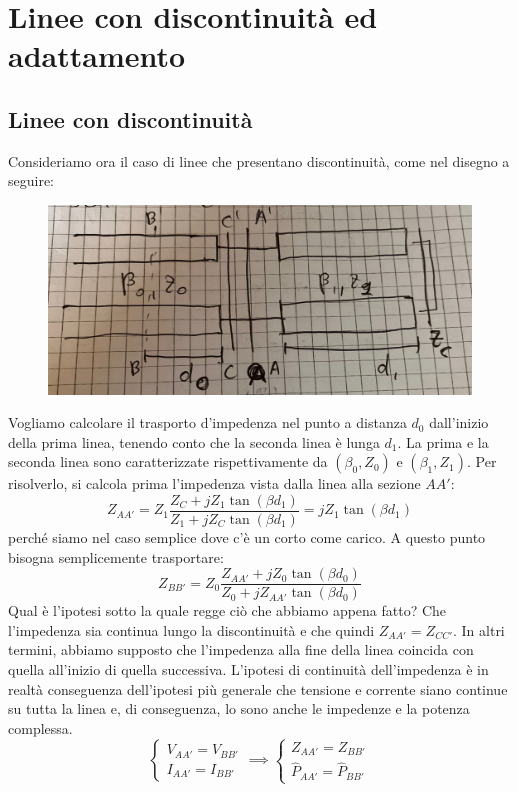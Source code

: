 \documentclass{book}
\begin{document}
    \section{Linee con discontinuità ed adattamento}
    \subsection*{Linee con discontinuità}
    Consideriamo ora il caso di linee che presentano discontinuità, come nel disegno a seguire:
    \begin{figure}[h!]
        \center  
        \includegraphics[width=0.6\linewidth]{Chapter_two/Chapt2img15.png}
    \end{figure}
    Vogliamo calcolare il trasporto d'impedenza nel punto a distanza $d_{0}$ dall'inizio della prima linea, tenendo conto che la seconda 
    linea è lunga $d_{1}$. La prima e la seconda linea sono caratterizzate rispettivamente da $(\beta_{0}, Z_{0})$ e $(\beta_{1}, Z_{1})$.
    Per risolverlo, si calcola prima l'impedenza vista dalla linea alla sezione $AA'$:
    \begin{equation}
        Z_{AA'} = Z_{1} \frac{Z_{C}+jZ_{1}\tan(\beta d_{1})}{Z_{1}+jZ_{C}\tan(\beta d_{1})} = j Z_{1}\tan(\beta d_{1})
    \end{equation}
    perché siamo nel caso semplice dove c'è un corto come carico. A questo punto bisogna semplicemente trasportare:
    \begin{equation}
        Z_{BB'} = Z_{0} \frac{Z_{AA'}+jZ_{0}\tan(\beta d_{0})}{Z_{0}+jZ_{AA'}\tan(\beta d_{0})}
    \end{equation}
    Qual è l'ipotesi sotto la quale regge ciò che abbiamo appena fatto? Che l'impedenza sia continua lungo la discontinuità 
    e che quindi $Z_{AA'}=Z_{CC'}$. In altri termini, abbiamo supposto che l'impedenza alla fine della linea coincida con quella all'inizio 
    di quella successiva. L'ipotesi di continuità dell'impedenza è in realtà conseguenza dell'ipotesi più generale che tensione e corrente 
    siano continue su tutta la linea e, di conseguenza, lo sono anche le impedenze e la potenza complessa.
    \begin{equation}
        \begin{cases}
            V_{AA'}=V_{BB'} \\
            I_{AA'} = I_{BB'}
        \end{cases} \implies 
        \begin{cases}
            Z_{AA'} = Z_{BB'} \\
            \hat{P}_{AA'} = \hat{P}_{BB'}
        \end{cases}
    \end{equation}
\end{document}
